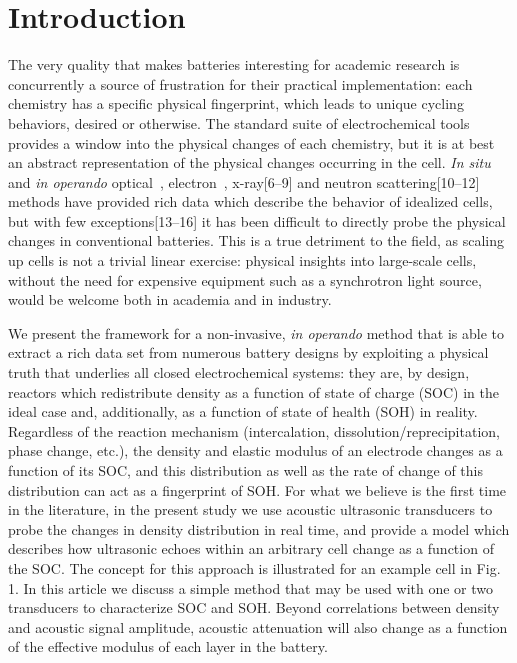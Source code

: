 \section{Introduction}
\label{sec:bw:intro}

The very quality that makes batteries interesting for academic research is concurrently a source of frustration for their practical implementation: each chemistry has a specific physical fingerprint, which leads to unique cycling behaviors, desired or otherwise. The standard suite of electrochemical tools provides a window into the physical changes of each chemistry, but it is at best an abstract representation of the physical changes occurring in the cell. \textit{In situ} and \textit{in operando} optical~\cite{Ito2011-ir,Gallaway2010-xk}, electron~\cite{Santhanagopalan2014-xh,Karki2014-jj,Radisic2006-zq}, x-ray[6–9] and neutron scattering[10–12] methods have provided rich data which describe the behavior of idealized cells, but with few exceptions[13–16] it has been difficult to directly probe the physical changes in conventional batteries. This is a true detriment to the field, as scaling up cells is not a trivial linear exercise: physical insights into large-scale cells, without the need for expensive equipment such as a synchrotron light source, would be welcome both in academia and in industry.

We present the framework for a non-invasive, \textit{in operando} method that is able to extract a rich data set from numerous battery designs by exploiting a physical truth that underlies all closed electrochemical systems: they are, by design, reactors which redistribute density as a function of state of charge (SOC) in the ideal case and, additionally, as a function of state of health (SOH) in reality. Regardless of the reaction mechanism (intercalation, dissolution/reprecipitation, phase change, etc.), the density and elastic modulus of an electrode changes as a function of its SOC, and this distribution as well as the rate of change of this distribution can act as a fingerprint of SOH. For what we believe is the first time in the literature, in the present study we use acoustic ultrasonic transducers to probe the changes in density distribution in real time, and provide a model which describes how ultrasonic echoes within an arbitrary cell change as a function of the SOC. The concept for this approach is illustrated for an example cell in Fig. 1. In this article we discuss a simple method that may be used with one or two transducers to characterize SOC and SOH. Beyond correlations between density and acoustic signal amplitude, acoustic attenuation will also change as a function of the effective modulus of each layer in the battery.

